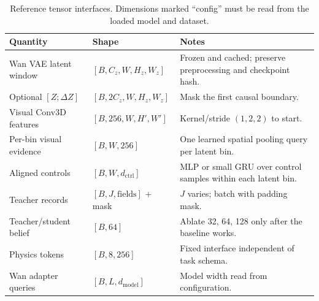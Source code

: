 \documentclass[11pt]{article}
\begin{document}
\begin{table}[H]
\centering
\small
\caption{Reference tensor interfaces.  Dimensions marked ``config'' must be read from the loaded model and dataset.}
\begin{tabularx}{\textwidth}{L{0.22\textwidth} L{0.31\textwidth} Y}
\toprule
Quantity & Shape & Notes \\
\midrule
Wan VAE latent window & $[B,C_z,W,H_z,W_z]$ & Frozen and cached; preserve preprocessing and checkpoint hash. \\
Optional $[Z;\Delta Z]$ & $[B,2C_z,W,H_z,W_z]$ & Mask the first causal boundary. \\
Visual Conv3D features & $[B,256,W,H',W']$ & Kernel/stride $(1,2,2)$ to start. \\
Per-bin visual evidence & $[B,W,256]$ & One learned spatial pooling query per latent bin. \\
Aligned controls & $[B,W,d_{\mathrm{ctrl}}]$ & MLP or small GRU over control samples within each latent bin. \\
Teacher records & $[B,J,\text{fields}]$ + mask & $J$ varies; batch with padding mask. \\
Teacher/student belief & $[B,64]$ & Ablate 32, 64, 128 only after the baseline works. \\
Physics tokens & $[B,8,256]$ & Fixed interface independent of task schema. \\
Wan adapter queries & $[B,L,d_{\mathrm{model}}]$ & Model width read from configuration. \\
\bottomrule
\end{tabularx}
\end{table}
\end{document}
